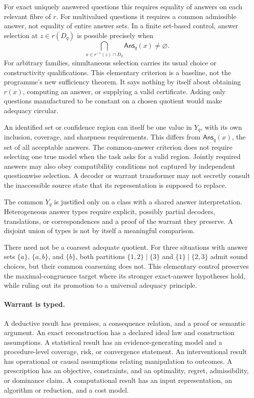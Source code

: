 \documentclass[11pt]{article}
\theoremstyle{definition}
\newcommand{\Ans}{\mathsf{Ans}}
\begin{document}
For exact uniquely answered questions this requires equality of answers on each relevant fibre of $r$. For multivalued questions it requires a common admissible answer, not equality of entire answer sets. In a finite set-based control, answer selection at $z\in r(D_q)$ is possible precisely when
\[
 \bigcap_{x\in r^{-1}(z)\cap D_q}\Ans_q(x)\ne\varnothing.
\]
For arbitrary families, simultaneous selection carries its usual choice or constructivity qualifications. This elementary criterion is a baseline, not the programme's new sufficiency theorem. It says nothing by itself about obtaining $r(x)$, computing an answer, or supplying a valid certificate. Asking only questions manufactured to be constant on a chosen quotient would make adequacy circular.

An identified set or confidence region can itself be one value in $Y_q$, with its own inclusion, coverage, and sharpness requirements. This differs from $\Ans_q(x)$, the set of all acceptable answers. The common-answer criterion does not require selecting one true model when the task asks for a valid region. Jointly required answers may also obey compatibility conditions not captured by independent questionwise selection. A decoder or warrant transformer may not secretly consult the inaccessible source state that its representation is supposed to replace.

The common $Y_q$ is justified only on a class with a shared answer interpretation. Heterogeneous answer types require explicit, possibly partial decoders, translations, or correspondences and a proof of the warrant they preserve. A disjoint union of types is not by itself a meaningful comparison.

There need not be a coarsest adequate quotient. For three situations with answer sets $\{a\}$, $\{a,b\}$, and $\{b\}$, both partitions $\{1,2\}\mid\{3\}$ and $\{1\}\mid\{2,3\}$ admit sound choices, but their common coarsening does not. This elementary control preserves the maximal-congruence target where its stronger exact-answer hypotheses hold, while ruling out its promotion to a universal adequacy principle.

\paragraph{Warrant is typed.}
A deductive result has premises, a consequence relation, and a proof or semantic argument. An exact reconstruction has a declared ideal law and construction assumptions. A statistical result has an evidence-generating model and a procedure-level coverage, risk, or convergence statement. An interventional result has operational or causal assumptions relating manipulation to outcomes. A prescription has an objective, constraints, and an optimality, regret, admissibility, or dominance claim. A computational result has an input representation, an algorithm or reduction, and a cost model.
\end{document}
